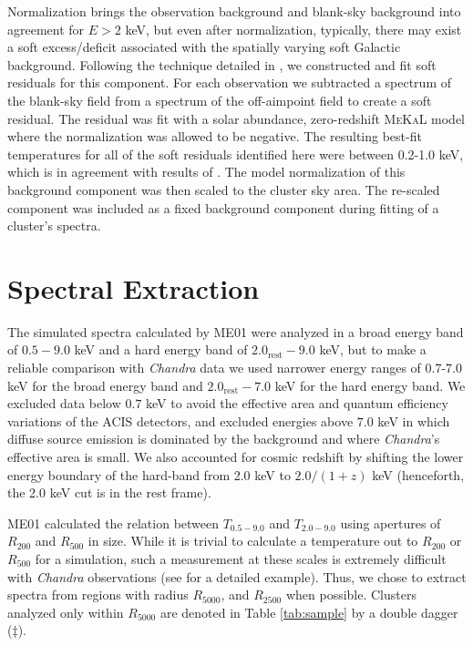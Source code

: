 \documentclass[apj]{emulateapj}
\begin{document}
Normalization brings the observation background and blank-sky
background into agreement for $E > 2$ keV, but even after
normalization, typically, there may exist a soft excess/deficit
associated with the spatially varying soft Galactic
background. Following the technique detailed in
\cite{2005ApJ...628..655V}, we constructed and fit soft residuals for
this component. For each observation we subtracted a spectrum of the
blank-sky field from a spectrum of the off-aimpoint field to create a
soft residual. The residual was fit with a solar abundance,
zero-redshift {\textsc{MeKaL}} model \citep{1985A&AS...62..197M,
1986A&AS...65..511M, 1992SRON, 1995ApJ...438L.115L} where the
normalization was allowed to be negative. The resulting best-fit
temperatures for all of the soft residuals identified here were
between 0.2-1.0 keV, which is in agreement with results of
\cite{2005ApJ...628..655V}. The model normalization of this background
component was then scaled to the cluster sky area. The re-scaled
component was included as a fixed background component during fitting
of a cluster's spectra.

\section{Spectral Extraction} \label{sec:extraction}

The simulated spectra calculated by ME01 were analyzed in a broad
energy band of $0.5-9.0$ keV and a hard energy band of
$2.0_{\mathrm{rest}}-9.0$ keV, but to make a reliable comparison with
{\it{Chandra}} data we used narrower energy ranges of 0.7-7.0 keV for
the broad energy band and $2.0_{\mathrm{rest}}-7.0$ keV for the hard
energy band. We excluded data below $0.7$ keV to
avoid the effective area and quantum efficiency variations of the ACIS
detectors, and excluded energies above $7.0$ keV in which diffuse source
emission is dominated by the background and where {\it{Chandra}}'s
effective area is small. We also accounted for cosmic redshift by
shifting the lower energy boundary of the hard-band from 2.0 keV to
$2.0/(1+z)$ keV (henceforth, the 2.0 keV cut is in the rest
frame).

ME01 calculated the relation between $T_{0.5-9.0}$ and $T_{2.0-9.0}$
using apertures of $R_{200}$ and $R_{500}$ in size. While it is
trivial to calculate a temperature out to $R_{200}$ or $R_{500}$ for
a simulation, such a measurement at these scales is extremely
difficult with {\it Chandra} observations (see \cite{2005ApJ...628..655V} for
a detailed example). Thus, we chose to extract spectra from regions
with radius $R_{5000}$, and $R_{2500}$ when possible. Clusters
analyzed only within $R_{5000}$ are denoted in Table \ref{tab:sample}
by a double dagger ($\ddagger$).
\end{document}
